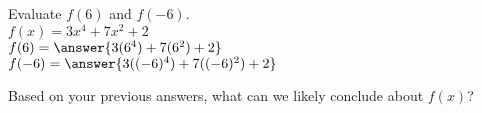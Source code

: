 \documentclass{ximera}
\author{David Kish}
\begin{document}
\begin{exercise}
Evaluate $f(6)$ and $f(-6)$.\\
$f(x)= 3x^4+7x^2+ 2$\\
$f(6)=\answer{3(6^4)+7(6^2)+2}$\\
$f(-6)=\answer{3((-6)^4)+7((-6)^2)+2}$
\end{exercise}
\begin{exercise}
Based on your previous answers, what can we likely conclude about $f(x)$?
\begin{multipleChoice}
\end{multipleChoice}
\end{exercise}
\end{document}
